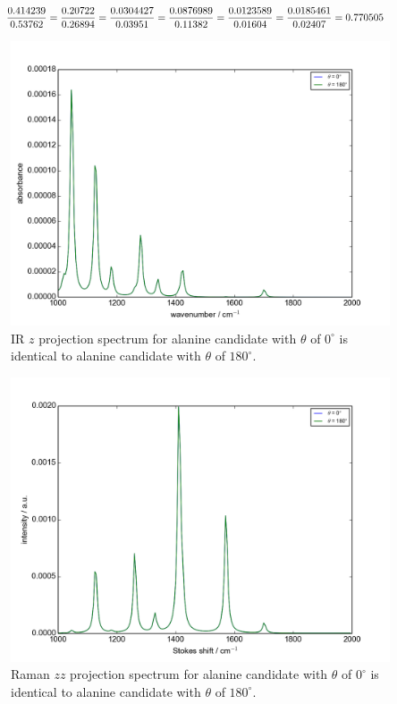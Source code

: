\begin{eqnarray} 
\resizebox{0.9\linewidth}{!}{$
\begin{split}
\frac{0.414239}{0.53762} &= \frac{0.20722}{0.26894} = \frac{0.0304427}{0.03951}  =\frac{0.0876989}{0.11382} = \frac{0.0123589}{0.01604} = \frac{0.0185461}{0.02407} = 0.770505
\end{split}
$}\label{eqn:A.10}
\end{eqnarray}


\begin{figure}[!ht] 
\centering
\includegraphics[scale=0.7]{Figures/Ala_candidates_plotting_ir_z_2.png}
\caption{IR $z$ projection spectrum for alanine candidate with $\theta$ of $0^{\circ}$ is identical to alanine candidate with $\theta$ of $180^{\circ}$.} \label{fig:A.1}
\end{figure}

\begin{figure}[!ht] 
\centering
\includegraphics[scale=0.7]{Figures/Ala_candidates_plotting_raman_zz_2.png}
\caption{Raman $zz$ projection spectrum for alanine candidate with $\theta$ of $0^{\circ}$ is identical to alanine candidate with $\theta$ of $180^{\circ}$.} \label{fig:A.2}
\end{figure}

